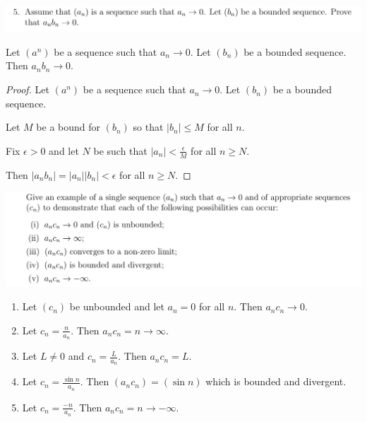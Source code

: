 \documentclass[12pt]{article}
\begin{document}
\newpage
\subsection{}
\begin{mdframed}
  \includegraphics[width=400pt]{img/oxford-M2-analysis-I-3-5-1.png}
\end{mdframed}
\begin{claim*}
  Let $(a^n)$ be a sequence such that $a_n \to 0$. Let $(b_n)$ be a bounded sequence. Then
  $a_nb_n \to 0$.

\end{claim*}
\begin{proof}
  Let $(a^n)$ be a sequence such that $a_n \to 0$. Let $(b_n)$ be a bounded sequence.

  Let $M$ be a bound for $(b_n)$ so that $|b_n| \leq M$ for all $n$.

  Fix $\epsilon > 0$ and let $N$ be such that $|a_n| < \frac{\epsilon}{M}$ for all $n \geq N$.

  Then $|a_nb_n| = |a_n||b_n| < \epsilon$ for all $n \geq N$.
\end{proof}

\begin{mdframed}
  \includegraphics[width=400pt]{img/oxford-M2-analysis-I-3-5-2.png}
\end{mdframed}

\begin{enumerate}[label=(\roman*)]
\item Let $(c_n)$ be unbounded and let $a_n = 0$ for all $n$. Then $a_nc_n \to 0$.
\item Let $c_n = \frac{n}{a_n}$. Then $a_nc_n = n \to \infty$.
\item Let $L \neq 0$ and $c_n = \frac{L}{a_n}$. Then $a_nc_n = L$.
\item Let $c_n = \frac{\sin n}{a_n}$. Then $(a_nc_n) = (\sin n)$ which is bounded and divergent.
\item Let $c_n = \frac{-n}{a_n}$. Then $a_nc_n = n \to -\infty$.
\end{enumerate}
\end{document}
